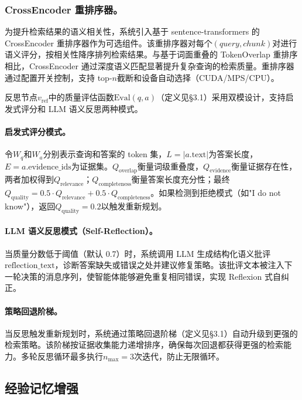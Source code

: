 \documentclass[runningheads]{llncs}
\begin{document}
\subsubsection{CrossEncoder 重排序器。}

为提升检索结果的语义相关性，系统引入基于 sentence-transformers 的 CrossEncoder 重排序器作为可选组件。该重排序器对每个$(query, chunk)$对进行语义评分，按相关性降序排列检索结果。与基于词面重叠的 TokenOverlap 重排序相比，CrossEncoder 通过深度语义匹配显著提升复杂查询的检索质量。重排序器通过配置开关控制，支持 top-$n$截断和设备自动选择（CUDA/MPS/CPU）。

反思节点$v_{\text{ref}}$中的质量评估函数$\text{Eval}(q, a)$（定义见§3.1）采用双模设计，支持启发式评分和 LLM 语义反思两种模式。

\paragraph{启发式评分模式。}
令$W_q$和$W_a$分别表示查询和答案的 token 集，$L = |a.\text{text}|$为答案长度，$E = a.\text{evidence\_ids}$为证据集。$Q_{\text{overlap}}$衡量词级重叠度，$Q_{\text{evidence}}$衡量证据存在性，两者加权得到$Q_{\text{relevance}}$；$Q_{\text{completeness}}$衡量答案长度充分性；最终$Q_{\text{quality}} = 0.5 \cdot Q_{\text{relevance}} + 0.5 \cdot Q_{\text{completeness}}$。如果检测到拒绝模式（如"I do not know"），返回$Q_{\text{quality}} = 0.2$以触发重新规划。

\paragraph{LLM 语义反思模式（Self-Reflection）。}
当质量分数低于阈值（默认 0.7）时，系统调用 LLM 生成结构化语义批评$\text{reflection\_text}$，诊断答案缺失或错误之处并建议修复策略。该批评文本被注入下一轮决策的消息序列，使智能体能够避免重复相同错误，实现 Reflexion 式自纠正。

\paragraph{策略回退阶梯。}
当反思触发重新规划时，系统通过策略回退阶梯（定义见§3.1）自动升级到更强的检索策略。该阶梯按证据收集能力递增排序，确保每次回退都获得更强的检索能力。多轮反思循环最多执行$n_{\max} = 3$次迭代，防止无限循环。

\subsection{经验记忆增强}
\end{document}
